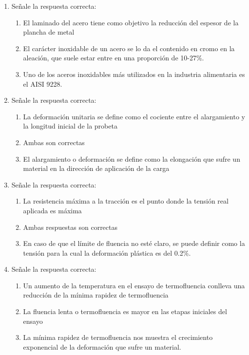 \begin{enumerate}[label=\textbf{\arabic*.}]
    \item Señale la respuesta correcta:
          \begin{enumerate}[label=\alph*.]
              \item El laminado del acero tiene como objetivo la reducción del espesor de la plancha de metal
              \item \textcolor{red!85!black}{El carácter inoxidable de un acero se lo da el contenido en cromo en la aleación, que suele estar entre en una proporción de 10-27\%.}
              \item Uno de los aceros inoxidables más utilizados en la industria alimentaria es el AISI 9228.
          \end{enumerate}

    \item Señale la respuesta correcta:
          \begin{enumerate}[label=\alph*.]
              \item La deformación unitaria se define como el cociente entre el alargamiento y la longitud inicial de la probeta
              \item \textcolor{red!85!black}{Ambas son correctas}
              \item El alargamiento o deformación se define como la elongación que sufre un material en la dirección de aplicación de la carga
          \end{enumerate}

    \item Señale la respuesta correcta:
          \begin{enumerate}[label=\alph*.]
              \item La resistencia máxima a la tracción es el punto donde la tensión real aplicada es máxima
              \item Ambas respuestas son correctas
              \item \textcolor{red!85!black}{En caso de que el límite de fluencia no esté claro, se puede definir como la tensión para la cual la deformación plástica es del 0.2\%.}
          \end{enumerate}

    \item Señale la respuesta correcta:
          \begin{enumerate}[label=\alph*.]
              \item Un aumento de la temperatura en el ensayo de termofluencia conlleva una reducción de la mínima rapidez de termofluencia
              \item La fluencia lenta o termofluencia es mayor en las etapas iniciales del ensayo
              \item \textcolor{red!85!black}{La mínima rapidez de termofluencia nos muestra el crecimiento exponencial de la deformación que sufre un material.}
          \end{enumerate}


\end{enumerate}
